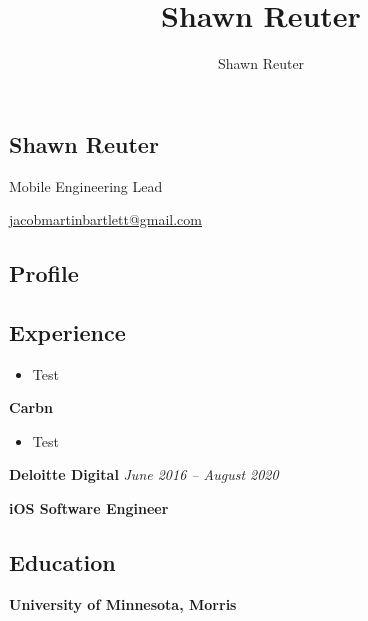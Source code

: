 \documentclass[11pt, oneside]{article}
\title{Shawn Reuter}
\author{Shawn Reuter}
\begin{document}
\begin{center}
\section*{Shawn Reuter}
Mobile Engineering Lead

\href{jacobmartinbartlett@gmail.com}{jacobmartinbartlett@gmail.com}
\end{center}

\subsection*{Profile}


\medskip
\subsection*{Experience}


\begin{itemize}
\item Test
\end{itemize}

\medskip

\textbf{Carbn}
\hfill

\begin{itemize} 
  \item Test
\end{itemize}

\medskip

\textbf{Deloitte Digital}
\hfill
\textit{June 2016 – August 2020}
								 
\textbf{iOS Software Engineer}

\begin{itemize}
\end{itemize}

\medskip

\subsection*{Education}
\textbf{University of Minnesota, Morris}
\hfill
\end{document}
